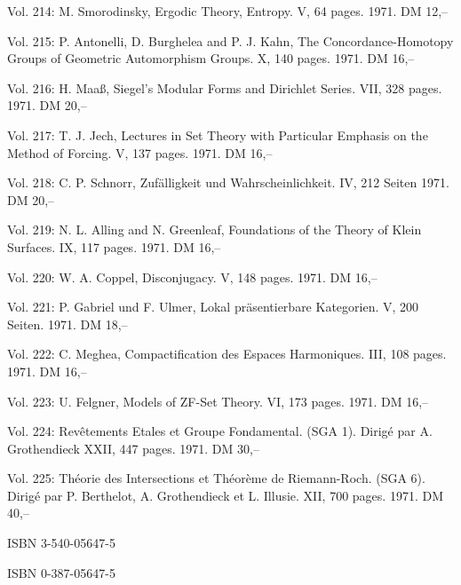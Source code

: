 Vol. 214: M. Smorodinsky, Ergodic Theory, Entropy. V, 64 pages. 1971. DM 12,--

Vol. 215: P. Antonelli, D. Burghelea and P. J. Kahn, The Concordance-Homotopy Groups of Geometric Automorphism Groups. X, 140 pages. 1971. DM 16,--

Vol. 216: H. Maaß, Siegel's Modular Forms and Dirichlet Series. VII, 328 pages. 1971. DM 20,--

Vol. 217: T. J. Jech, Lectures in Set Theory with Particular Emphasis on the Method of Forcing. V, 137 pages. 1971. DM 16,--

Vol. 218: C. P. Schnorr, Zufälligkeit und Wahrscheinlichkeit. IV, 212 Seiten 1971. DM 20,--

Vol. 219: N. L. Alling and N. Greenleaf, Foundations of the Theory of Klein Surfaces. IX, 117 pages. 1971. DM 16,--

Vol. 220: W. A. Coppel, Disconjugacy. V, 148 pages. 1971. DM 16,--

Vol. 221: P. Gabriel und F. Ulmer, Lokal präsentierbare Kategorien. V, 200 Seiten. 1971. DM 18,--

Vol. 222: C. Meghea, Compactification des Espaces Harmoniques. III, 108 pages. 1971. DM 16,--

Vol. 223: U. Felgner, Models of ZF-Set Theory. VI, 173 pages. 1971. DM 16,--

Vol. 224: Revêtements Etales et Groupe Fondamental. (SGA 1). Dirigé par A. Grothendieck XXII, 447 pages. 1971. DM 30,--

Vol. 225: Théorie des Intersections et Théorème de Riemann-Roch. (SGA 6). Dirigé par P. Berthelot, A. Grothendieck et L. Illusie. XII, 700 pages. 1971. DM 40,--

%
ISBN 3-540-05647-5\par
ISBN 0-387-05647-5

